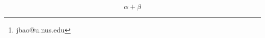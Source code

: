 \documentclass[11pt]{article}
\begin{document}
\title{}
\author{Jinge Bao\thanks{jbao@u.nus.edu}}
\date{\today}

\maketitle


\begin{abstract}

\end{abstract}

\section{}
\cite{MR3909576}
$$\alpha+\beta$$




\end{document}
